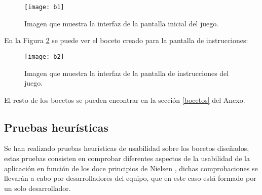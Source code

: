 \begin{figure}[h]
  \centering
  \texttt{[image: b1]}
  \caption{Imagen que muestra la interfaz de la pantalla inicial del juego.\protect\footnotemark}
  \label{figura-b1}
\end{figure}

\newpage

En la Figura \ref{figura-b2} se puede ver el boceto creado para la pantalla de instrucciones:

\begin{figure}[h]
  \centering
  \texttt{[image: b2]}
  \caption{Imagen que muestra la interfaz de la pantalla de instrucciones del juego.\protect\footnotemark}
  \label{figura-b2}
\end{figure}

El resto de los bocetos se pueden encontrar en la sección \ref{bocetos} del Anexo.

\subsection{Pruebas heurísticas}
Se han realizado pruebas heurísticas de usabilidad sobre los bocetos diseñados, estas pruebas consisten en comprobar diferentes aspectos de la usabilidad de la aplicación en función de los doce principios de Nielsen \cite{nielsen}, dichas comprobaciones se llevarán a cabo por desarrolladores del equipo, que en este caso está formado por un solo desarrollador.

